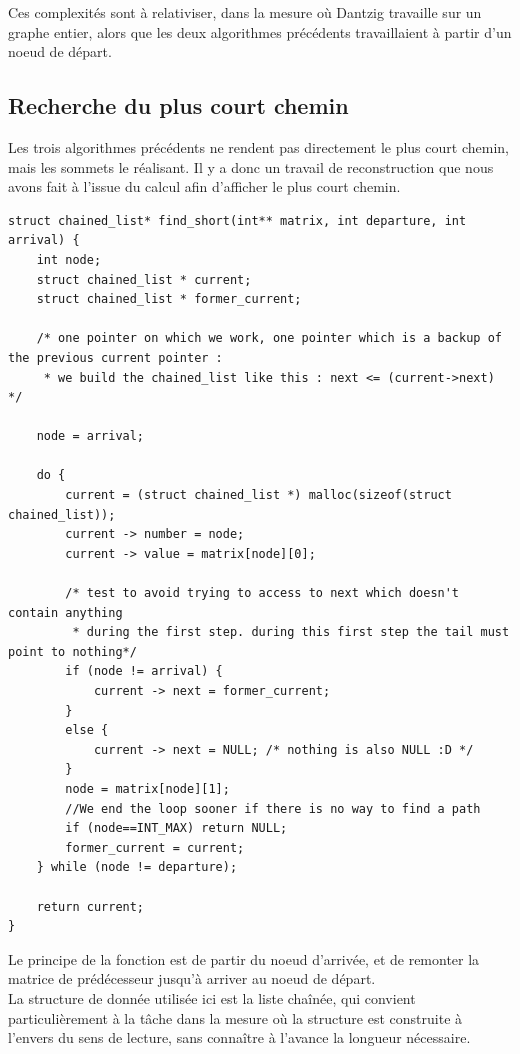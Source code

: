 \documentclass[a4paper,12pt,final] {article}
\begin{document}
Ces complexités sont à relativiser, dans la mesure où Dantzig travaille sur un graphe entier, alors que les deux algorithmes précédents travaillaient à partir d'un noeud de départ.\\

\subsection{Recherche du plus court chemin}

Les trois algorithmes précédents ne rendent pas directement le plus court chemin, mais les sommets le réalisant. Il y a donc un travail de reconstruction que nous avons fait à l'issue du calcul afin d'afficher le plus court chemin.\\

\begin{lstlisting}
struct chained_list* find_short(int** matrix, int departure, int arrival) {
	int node;
	struct chained_list * current;
	struct chained_list * former_current;
	
	/* one pointer on which we work, one pointer which is a backup of the previous current pointer :
	 * we build the chained_list like this : next <= (current->next) */
	
	node = arrival;
	
	do {
		current = (struct chained_list *) malloc(sizeof(struct chained_list));
		current -> number = node;
		current -> value = matrix[node][0];
		
		/* test to avoid trying to access to next which doesn't contain anything 
		 * during the first step. during this first step the tail must point to nothing*/
		if (node != arrival) {
			current -> next = former_current;
		}
		else {
			current -> next = NULL; /* nothing is also NULL :D */
		}
		node = matrix[node][1];
		//We end the loop sooner if there is no way to find a path
		if (node==INT_MAX) return NULL;
		former_current = current;
	} while (node != departure);
	
	return current;
}
\end{lstlisting}

Le principe de la fonction est de partir du noeud d'arrivée, et de remonter la matrice de prédécesseur jusqu'à arriver au noeud de départ. \\

La structure de donnée utilisée ici est la liste chaînée, qui convient particulièrement à la tâche dans la mesure où la structure est construite à l'envers du sens de lecture, sans connaître à l'avance la longueur nécessaire.\\
\end{document}

